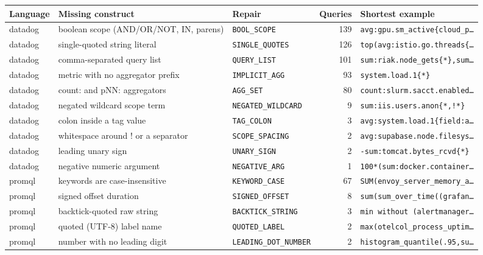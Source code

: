 \begin{tabular}{@{}lllrl@{}}
\toprule
Language & Missing construct & Repair & Queries & Shortest example \\
\midrule
datadog & boolean scope (AND/OR/NOT, IN, parens) & \texttt{BOOL\_SCOPE} & 139 & \texttt{avg:gpu.sm\_active\{cloud\_p\dots{}} \\
datadog & single-quoted string literal & \texttt{SINGLE\_QUOTES} & 126 & \texttt{top(avg:istio.go.threads\{\dots{}} \\
datadog & comma-separated query list & \texttt{QUERY\_LIST} & 101 & \texttt{sum:riak.node\_gets\{*\},sum\dots{}} \\
datadog & metric with no aggregator prefix & \texttt{IMPLICIT\_AGG} & 93 & \texttt{system.load.1\{*\}} \\
datadog & count: and pNN: aggregators & \texttt{AGG\_SET} & 80 & \texttt{count:slurm.sacct.enabled\dots{}} \\
datadog & negated wildcard scope term & \texttt{NEGATED\_WILDCARD} & 9 & \texttt{sum:iis.users.anon\{*,!*\}} \\
datadog & colon inside a tag value & \texttt{TAG\_COLON} & 3 & \texttt{avg:system.load.1\{field:a\dots{}} \\
datadog & whitespace around ! or a separator & \texttt{SCOPE\_SPACING} & 2 & \texttt{avg:supabase.node.filesys\dots{}} \\
datadog & leading unary sign & \texttt{UNARY\_SIGN} & 2 & \texttt{-sum:tomcat.bytes\_rcvd\{*\}} \\
datadog & negative numeric argument & \texttt{NEGATIVE\_ARG} & 1 & \texttt{100*(sum:docker.container\dots{}} \\
promql & keywords are case-insensitive & \texttt{KEYWORD\_CASE} & 67 & \texttt{SUM(envoy\_server\_memory\_a\dots{}} \\
promql & signed offset duration & \texttt{SIGNED\_OFFSET} & 8 & \texttt{sum(sum\_over\_time((grafan\dots{}} \\
promql & backtick-quoted raw string & \texttt{BACKTICK\_STRING} & 3 & \texttt{min without (alertmanager\dots{}} \\
promql & quoted (UTF-8) label name & \texttt{QUOTED\_LABEL} & 2 & \texttt{max(otelcol\_process\_uptim\dots{}} \\
promql & number with no leading digit & \texttt{LEADING\_DOT\_NUMBER} & 2 & \texttt{histogram\_quantile(.95,su\dots{}} \\
\bottomrule
\end{tabular}
